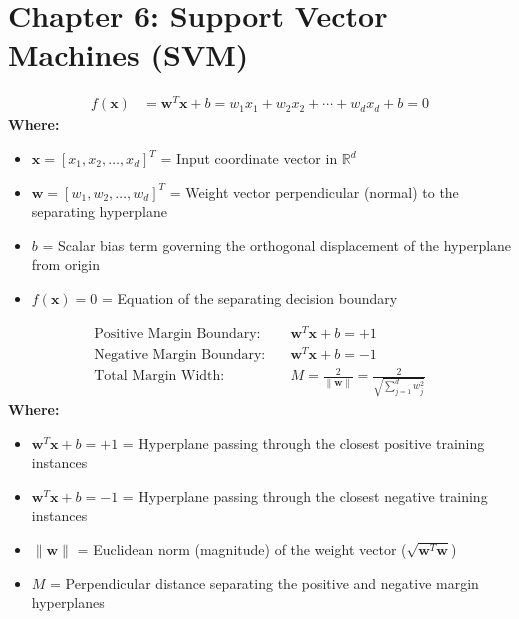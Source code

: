 \section*{Chapter 6: Support Vector Machines (SVM)}

\begin{formulabox}
\begin{align*}
    f(\mathbf{x}) &= \mathbf{w}^T \mathbf{x} + b = w_1 x_1 + w_2 x_2 + \cdots + w_d x_d + b = 0
\end{align*}
\textbf{Where:}
\begin{itemize}[noitemsep, topsep=1pt]
    \item $\mathbf{x} = [x_1, x_2, \dots, x_d]^T$ = Input coordinate vector in $\mathbb{R}^d$
    \item $\mathbf{w} = [w_1, w_2, \dots, w_d]^T$ = Weight vector perpendicular (normal) to the separating hyperplane
    \item $b$ = Scalar bias term governing the orthogonal displacement of the hyperplane from origin
    \item $f(\mathbf{x}) = 0$ = Equation of the separating decision boundary
\end{itemize}
\end{formulabox}

\begin{formulabox}
\begin{align*}
    \text{Positive Margin Boundary:} \quad & \mathbf{w}^T \mathbf{x} + b = +1 \\[2pt]
    \text{Negative Margin Boundary:} \quad & \mathbf{w}^T \mathbf{x} + b = -1 \\[2pt]
    \text{Total Margin Width:} \quad & M = \frac{2}{\|\mathbf{w}\|} = \frac{2}{\sqrt{\sum_{j=1}^d w_j^2}}
\end{align*}
\textbf{Where:}
\begin{itemize}[noitemsep, topsep=1pt]
    \item $\mathbf{w}^T \mathbf{x} + b = +1$ = Hyperplane passing through the closest positive training instances
    \item $\mathbf{w}^T \mathbf{x} + b = -1$ = Hyperplane passing through the closest negative training instances
    \item $\|\mathbf{w}\|$ = Euclidean norm (magnitude) of the weight vector ($\sqrt{\mathbf{w}^T \mathbf{w}}$)
    \item $M$ = Perpendicular distance separating the positive and negative margin hyperplanes
\end{itemize}
\end{formulabox}

